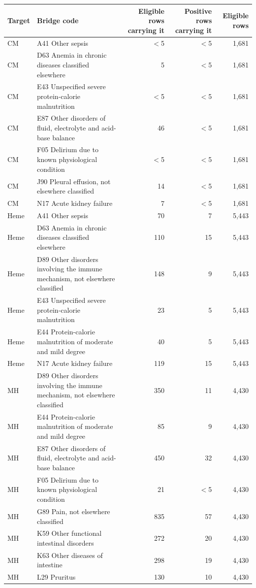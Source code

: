 \begin{tabular}{lp{}rrr}
\hline
Target & Bridge code & Eligible rows carrying it & Positive rows carrying it & Eligible rows \\
\hline
CM & A41 Other sepsis & $<$5 & $<$5 & 1,681 \\
CM & D63 Anemia in chronic diseases classified elsewhere & 5 & $<$5 & 1,681 \\
CM & E43 Unspecified severe protein-calorie malnutrition & $<$5 & $<$5 & 1,681 \\
CM & E87 Other disorders of fluid, electrolyte and acid-base balance & 46 & $<$5 & 1,681 \\
CM & F05 Delirium due to known physiological condition & $<$5 & $<$5 & 1,681 \\
CM & J90 Pleural effusion, not elsewhere classified & 14 & $<$5 & 1,681 \\
CM & N17 Acute kidney failure & 7 & $<$5 & 1,681 \\
Heme & A41 Other sepsis & 70 & 7 & 5,443 \\
Heme & D63 Anemia in chronic diseases classified elsewhere & 110 & 15 & 5,443 \\
Heme & D89 Other disorders involving the immune mechanism, not elsewhere classified & 148 & 9 & 5,443 \\
Heme & E43 Unspecified severe protein-calorie malnutrition & 23 & 5 & 5,443 \\
Heme & E44 Protein-calorie malnutrition of moderate and mild degree & 40 & 5 & 5,443 \\
Heme & N17 Acute kidney failure & 119 & 15 & 5,443 \\
MH & D89 Other disorders involving the immune mechanism, not elsewhere classified & 350 & 11 & 4,430 \\
MH & E44 Protein-calorie malnutrition of moderate and mild degree & 85 & 9 & 4,430 \\
MH & E87 Other disorders of fluid, electrolyte and acid-base balance & 450 & 32 & 4,430 \\
MH & F05 Delirium due to known physiological condition & 21 & $<$5 & 4,430 \\
MH & G89 Pain, not elsewhere classified & 835 & 57 & 4,430 \\
MH & K59 Other functional intestinal disorders & 272 & 20 & 4,430 \\
MH & K63 Other diseases of intestine & 298 & 19 & 4,430 \\
MH & L29 Pruritus & 130 & 10 & 4,430 \\

\end{tabular}
